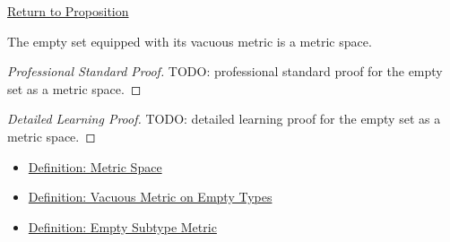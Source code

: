 \newpage
{}
\label{prf:empty-set-metric-space}

\begin{remark*}[Return]
\hyperref[prop:empty-set-metric-space]{Return to Proposition}
\end{remark*}

\begin{proposition*}
The empty set equipped with its vacuous metric is a metric space.
\end{proposition*}

\begin{proof}[Professional Standard Proof]
\LRAProofBodyStart
TODO: professional standard proof for the empty set as a metric space.
\end{proof}

\begin{proof}[Detailed Learning Proof]
\LRAProofBodyStart
TODO: detailed learning proof for the empty set as a metric space.
\end{proof}

\begin{remark*}
\end{remark*}

\begin{dependencies}
\begin{itemize}
  \item \hyperref[def:metric-space]{Definition: Metric Space}
  \item \hyperref[def:vacuous-metric-empty-types]{Definition: Vacuous Metric on Empty Types}
  \item \hyperref[def:empty-subtype-metric]{Definition: Empty Subtype Metric}
\end{itemize}
\end{dependencies}

\clearpage
